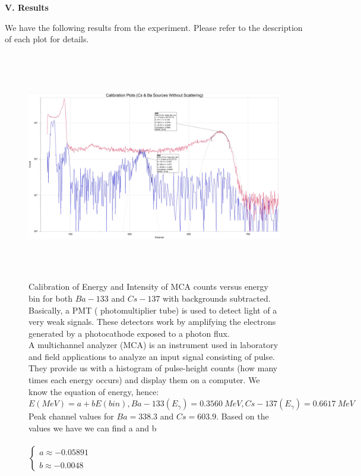 \documentclass[fleqn]{article}
\begin{document}
  \textbf{V. Results}

  \vspace{10px}

  We have the following results from the experiment. Please refer to the description of each plot for details.

  \begin{figure}[htbp]
    \includegraphics[height=10cm, width=18cm]{Three.JPG}
    \caption{
      Calibration of Energy and Intensity of MCA counts versus energy
      bin for both $Ba-133$ and $Cs-137$ with backgrounds subtracted. Basically, a PMT ( photomultiplier tube)
      is used to detect light of a very weak signals. These detectors work by amplifying the electrons generated by a photocathode 
      exposed to a photon flux. 
      \\
      A multichannel analyzer (MCA) is an instrument used in laboratory and field applications to analyze an input signal consisting of pulse.
      They provide us with a histogram of pulse-height counts (how many times each energy
      occurs) and display them on a computer. We know the equation of energy, hence:
      \\
      $
        E(MeV)=a+bE(bin), Ba-133(E_\gamma)=0.3560 ~ MeV, Cs-137(E_\gamma)=0.6617 ~ MeV
      $
      \\
      Peak channel values for $Ba=338.3$ and $Cs=603.9$. Based on the values we have we can find a and b
      \\
      \\
      $
        \begin{cases}
          a \approx -0.05891
          \\
          \\
          b \approx -0.0048
        \end{cases}
      $
     }
  \end{figure}
\end{document}
